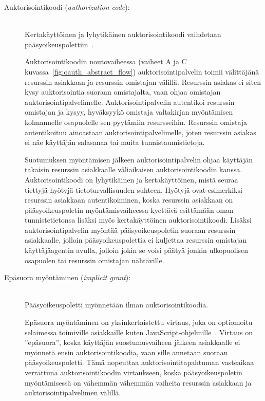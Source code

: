 \documentclass[finnish,gradu]{tktltiki}
\begin{document}
  \begin{description}
  \item[Auktorisointikoodi (\emph{authorization code}):] \hfill \\
  Kertakäyttöinen ja lyhytikäinen auktorisointikoodi vaihdetaan pääsyoikeuspolettiin~\cite{ietf_oauth2}.

  Auktorisointikoodin noutovaiheessa (vaiheet A ja C kuvassa~\ref{fig:oauth_abstract_flow}) auktorisointipalvelin toimii välittäjänä resurssin asiakkaan ja resurssin omistajan välillä. Resurssin asiakas ei siten kysy auktorisointia suoraan omistajalta, vaan ohjaa omistajan auktorisointipalvelimelle. Auktorisointipalvelin autentikoi resurssin omistajan ja kysyy, hyväksyykö omistaja valtakirjan myöntämisen kolmannelle osapuolelle sen pyytämiin resursseihin. Resurssin omistaja autentikoituu ainoastaan auktorisointipalvelimelle, joten resurssin asiakas ei näe käyttäjän salasanaa tai muita tunnistaumistietoja.

  Suotumuksen myöntämisen jälkeen auktorisointipalvelin ohjaa käyttäjän takaisin resurssin asiakkaalle väliaikaisen auktorisointikoodin kanssa. Auktorisointikoodi on lyhytikäinen ja kertakäyttöinen, mistä seuraa tiettyjä hyötyjä tietoturvallisuuden suhteen. Hyötyjä ovat esimerkiksi resurssin asiakkaan autentikoiminen, koska resurssin asiakkaan on pääsyoikeuspoletin myöntämisvaiheessa kyettävä esittämään oman tunnistetietonsa lisäksi myös kertakäyttöinen auktorisointikoodi. Lisäksi auktorisointipalvelin myöntää pääsyoikeuspoletin suoraan resurssin asiakkaalle, jolloin pääsyoikeuspolettia ei kuljettaa resurssin omistajan käyttäjäagentin avulla, jolloin jokin se voisi päätyä jonkin ulkopuolisen osapuolen tai resurssin omistajan nähtäville.

  \item[Epäsuora myöntäminen (\emph{implicit grant}):] \hfill \\
  Pääsyoikeuspoletti myönnetään ilman auktorisointikoodia.

  Epäsuora myöntäminen on yksinkertaistettu virtaus, joka on optiomoitu selaimessa toimiville asiakkaille kuten JavaScript-ohjelmille~\cite{ietf_oauth2}. Virtaus on ''epäsuora'', koska käyttäjän suostumusvaiheen jälkeen asiakkaalle ei myönnetä ensin auktorisointikoodia, vaan sille annetaan suoraan pääsyoikeuspoletti. Tämä nopeuttaa auktorisointitapahtuman vasteaikaa verrattuna auktorisointikoodin virtaukseen, koska pääsyoikeuspoletin myöntämisessä on vähemmän vähemmän vaiheita resurssin asiakkaan ja auktorisointipalvelimen välillä.


\end{description}
\end{document}
